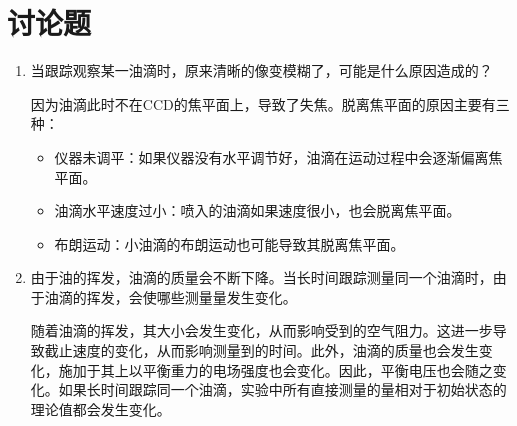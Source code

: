 \documentclass[signature=data]{physicsreport}
\begin{document}
\section{讨论题}
\begin{enumerate}
    \item 当跟踪观察某一油滴时，原来清晰的像变模糊了，可能是什么原因造成的？

   因为油滴此时不在CCD的焦平面上，导致了失焦。脱离焦平面的原因主要有三种：
\begin{itemize}
    \item 仪器未调平：如果仪器没有水平调节好，油滴在运动过程中会逐渐偏离焦平面。
    \item  油滴水平速度过小：喷入的油滴如果速度很小，也会脱离焦平面。
    \item 布朗运动：小油滴的布朗运动也可能导致其脱离焦平面。
\end{itemize}


    \item 由于油的挥发，油滴的质量会不断下降。当长时间跟踪测量同一个油滴时，由于油滴的挥发，会使哪些测量量发生变化。
    
\hspace{2em}
    随着油滴的挥发，其大小会发生变化，从而影响受到的空气阻力。这进一步导致截止速度的变化，从而影响测量到的时间。此外，油滴的质量也会发生变化，施加于其上以平衡重力的电场强度也会变化。因此，平衡电压也会随之变化。如果长时间跟踪同一个油滴，实验中所有直接测量的量相对于初始状态的理论值都会发生变化。
\end{enumerate}
\end{document}
